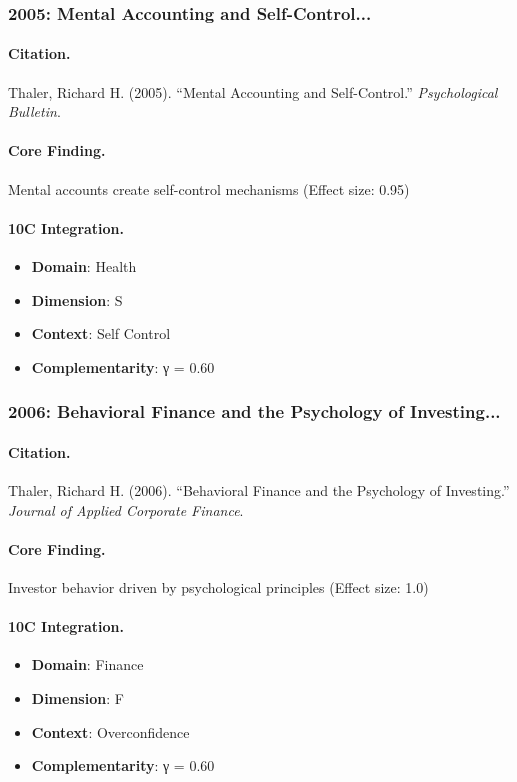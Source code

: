 \subsubsection{2005: Mental Accounting and Self-Control...}

\paragraph{Citation.}
Thaler, Richard H. (2005). ``Mental Accounting and Self-Control.''
\textit{Psychological Bulletin}.

\paragraph{Core Finding.}
Mental accounts create self-control mechanisms (Effect size: 0.95)

\paragraph{10C Integration.}
\begin{itemize}[nosep]
  \item \textbf{Domain}: Health
  \item \textbf{Dimension}: S
  \item \textbf{Context}: Self Control
  \item \textbf{Complementarity}: γ = 0.60
\end{itemize}

\subsubsection{2006: Behavioral Finance and the Psychology of Investing...}

\paragraph{Citation.}
Thaler, Richard H. (2006). ``Behavioral Finance and the Psychology of Investing.''
\textit{Journal of Applied Corporate Finance}.

\paragraph{Core Finding.}
Investor behavior driven by psychological principles (Effect size: 1.0)

\paragraph{10C Integration.}
\begin{itemize}[nosep]
  \item \textbf{Domain}: Finance
  \item \textbf{Dimension}: F
  \item \textbf{Context}: Overconfidence
  \item \textbf{Complementarity}: γ = 0.60
\end{itemize}

